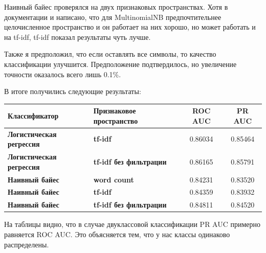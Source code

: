 \documentclass[12pt, a4paper]{article}
\begin{document}
            Наивный байес проверялся на двух признаковых пространствах. Хотя в документации и написано, что для MultinomialNB предпочтительнее целочисленное пространство и он работает на них хорошо, но может работать и на tf-idf, tf-idf показал результаты чуть лучше.

            Также я предположил, что если оставлять все символы, то качество классификации улучшится. Предположение подтвердилось, но увеличение точности оказалось всего лишь 0.1\%.

            В итоге получились следующие результаты:

            \begin{center}
            \begin{tabular}{| l | l | c | c |}
                \hline
                \textbf{Классификатор} & \textbf{Признаковое пространство} & \textbf{ROC AUC} & \textbf{PR AUC} \\
                \hline
                \textbf{Логистическая регрессия} & \textbf{tf-idf} & 0.86034 & 0.85464 \\
                \textbf{Логистическая регрессия} & \textbf{tf-idf без фильтрации} & 0.86165 & 0.85791 \\
                \textbf{Наивный байес} & \textbf{word count} & 0.84231 & 0.83520 \\
                \textbf{Наивный байес} & \textbf{tf-idf} & 0.84359 & 0.83932 \\
                \textbf{Наивный байес} & \textbf{tf-idf без фильтрации} & 0.84811 & 0.84520 \\
                \hline
            \end{tabular}
            \end{center}

            На таблицы видно, что в случае двуклассовой классификации PR AUC примерно равняется ROC AUC. Это объясняется тем, что у нас классы одинаково распределены.
\end{document}
